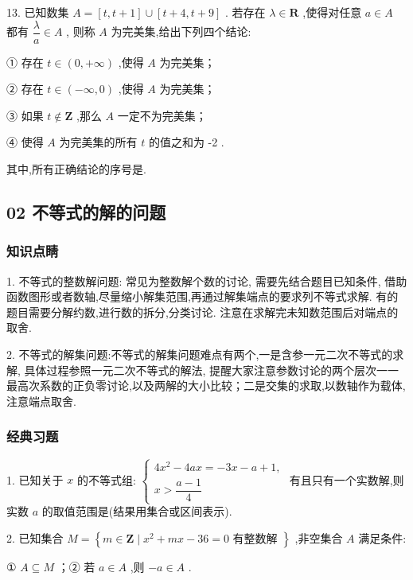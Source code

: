 13. 已知数集 $A = \left\lbrack  {t,t + 1}\right\rbrack   \cup  \left\lbrack  {t + 4,t + 9}\right\rbrack$ . 若存在 $\lambda  \in  \mathbf{R}$ ,使得对任意 $a \in  A$ 都有 $\dfrac{\lambda }{a} \in  A$ , 则称 $A$ 为完美集,给出下列四个结论:

① 存在 $t \in  \left( {0, + \infty }\right)$ ,使得 $A$ 为完美集；

② 存在 $t \in  \left( {-\infty ,0}\right)$ ,使得 $A$ 为完美集；

③ 如果 $t \notin  \mathbf{Z}$ ,那么 $A$ 一定不为完美集；

④ 使得 $A$ 为完美集的所有 $t$ 的值之和为 -2 .

其中,所有正确结论的序号是\blkda{}.

\subsection*{02 不等式的解的问题}

\subsubsection*{知识点睛}

1. 不等式的整数解问题: 常见为整数解个数的讨论, 需要先结合题目已知条件, 借助函数图形或者数轴,尽量缩小解集范围,再通过解集端点的要求列不等式求解. 有的题目需要分解约数,进行数的拆分,分类讨论. 注意在求解完未知数范围后对端点的取舍.

2. 不等式的解集问题:不等式的解集问题难点有两个,一是含参一元二次不等式的求解, 具体过程参照一元二次不等式的解法, 提醒大家注意参数讨论的两个层次一一最高次系数的正负零讨论,以及两解的大小比较；二是交集的求取,以数轴作为载体,注意端点取舍.

\subsubsection*{经典习题}

1. 已知关于 $x$ 的不等式组: $\left\{  \begin{array}{l} 4{x}^{2} - {4ax} =  - {3x} - a + 1, \\  x > \dfrac{a - 1}{4} \end{array}\right.$ 有且只有一个实数解,则实数 $a$ 的取值范围是\blkda{}(结果用集合或区间表示).

2. 已知集合 $M = \left\{  {m \in  \mathbf{Z} \mid  {x}^{2} + {mx} - {36} = 0\text{ 有整数解 }}\right\}$ ,非空集合 $A$ 满足条件:

① $A \subseteq  M$ ；② 若 $a \in  A$ ,则 $- a \in  A$ .

